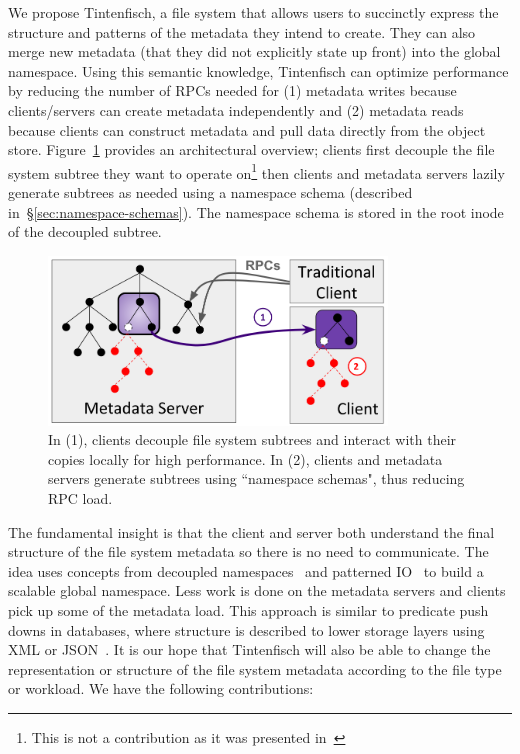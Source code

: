 We propose Tintenfisch, a file system that allows users to succinctly express
the structure and patterns of the metadata they intend to create.  They can
also merge new metadata (that they did not explicitly state up front) into the
global namespace.  Using this semantic knowledge, Tintenfisch can optimize
performance by reducing the number of RPCs needed for (1) metadata writes
because clients/servers can create metadata independently and (2) metadata
reads because clients can construct metadata and pull data directly from the
object store. Figure~\ref{fig:intro} provides an architectural overview;
clients first decouple the file system subtree they want to operate
on\footnote{This is not a contribution as it was presented
in~\cite{sevilla:ipdps18-cudele}} then clients and metadata servers lazily
generate subtrees as needed using a namespace schema (described
in~\S\ref{sec:namespace-schemas}). The namespace schema is stored in the root
inode of the decoupled subtree.

\begin{figure}[t]
  \centering
  \includegraphics[width=90mm]{figures/intro.png}
  \caption{In (1), clients decouple file system subtrees and interact
with their copies locally for high performance. In (2), clients and
metadata servers generate subtrees using ``namespace schemas", thus reducing
RPC load.  \label{fig:intro}}
\end{figure}

The fundamental insight is that the client and server both understand the final
structure of the file system metadata so there is no need to communicate.  The
idea uses concepts from decoupled namespaces~\cite{zheng:pdsw2014-batchfs,
zheng:pdsw2015-deltafs} and patterned IO~\cite{he:hpdc13-plfs-patterns} to
build a scalable global namespace. Less work is done on the metadata servers
and clients pick up some of the metadata load.  This approach is similar to
predicate push downs in databases, where structure is described to lower
storage layers using XML or JSON~\cite{shel:pc17-pushdown}. It is our hope that
Tintenfisch will also be able to change the representation or structure of the
file system metadata according to the file type or workload.  We have the
following contributions:

